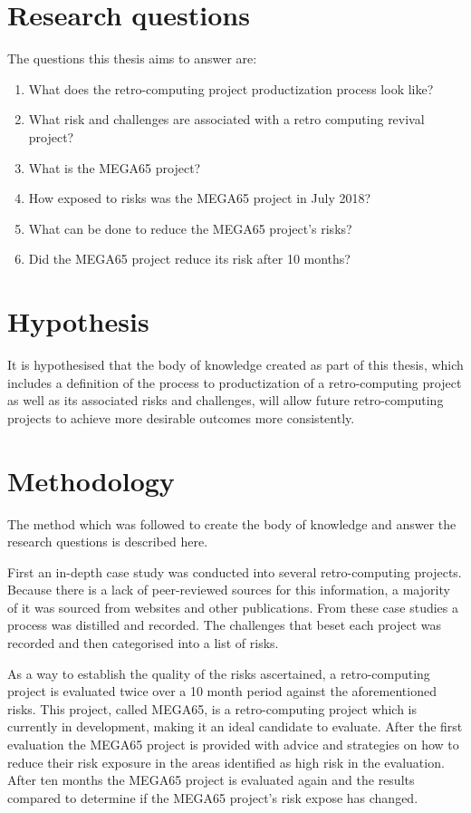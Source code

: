 \section{Research questions}
The questions this thesis aims to answer are:
\begin{enumerate}
\item What does the retro-computing project productization process look like?
\item What risk and challenges are associated with a retro computing revival project?
\item What is the MEGA65 project? 
\item How exposed to risks was the MEGA65 project in July 2018?
\item What can be done to reduce the MEGA65 project's risks?
\item Did the MEGA65 project reduce its risk after 10 months?
\end{enumerate}


\section{Hypothesis}
It is hypothesised that the body of knowledge created as part of this thesis, which includes a definition of the process to productization of a retro-computing project as well as its associated risks and challenges, will allow future retro-computing projects to achieve more desirable outcomes more consistently.


\section{Methodology}
The method which was followed to create the body of knowledge and answer the research questions is described here. 

First an in-depth case study was conducted into several retro-computing projects. Because there is a lack of peer-reviewed sources for this information, a majority of it was sourced from websites and other publications. From these case studies a process was distilled and recorded. The challenges that beset each project was recorded and then categorised into a list of risks. 

As a way to establish the quality of the risks ascertained, a retro-computing project is evaluated twice over a 10 month period against the aforementioned risks. This project, called MEGA65, is a retro-computing project which is currently in development, making it an ideal candidate to evaluate. After the first evaluation the MEGA65 project is provided with advice and strategies on how to reduce their risk exposure in the areas identified as high risk in the evaluation. After ten months the MEGA65 project is evaluated again and the results compared to determine if the MEGA65 project's risk expose has changed. 

